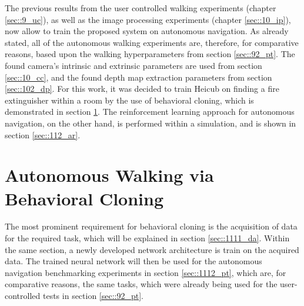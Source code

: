 
\label{sec::11_aw}
The previous results from the user controlled walking experiments (chapter \ref{sec::9_uc}), as well as the image processing experiments (chapter \ref{sec::10_ip}), now allow to train the proposed system on autonomous navigation. As already stated, all of the autonomous walking experiments are, therefore, for comparative reasons, based upon the walking hyperparameters from section \ref{sec::92_pt}. The found camera's intrinsic and extrinsic parameters are used from section \ref{sec::10_cc}, and the found depth map extraction parameters from section \ref{sec::102_dp}. For this work, it was decided to train Heicub on finding a fire extinguisher within a room by the use of behavioral cloning, which is demonstrated in section \ref{sec::111_bc}. The reinforcement learning approach for autonomous navigation, on the other hand, is performed within a simulation, and is shown in section \ref{sec::112_ar}. 
\FloatBarrier
\section{Autonomous Walking via Behavioral Cloning}

\label{sec::111_bc}
The most prominent requirement for behavioral cloning is the acquisition of data for the required task, which will be explained in section \ref{sec::1111_da}. Within the same section, a newly developed network architecture is train on the acquired data. The trained neural network will then be used for the autonomous navigation benchmarking experiments in section \ref{sec::1112_pt}, which are, for comparative reasons, the same tasks, which were already being used for the user-controlled tests in section \ref{sec::92_pt}. 
\FloatBarrier
